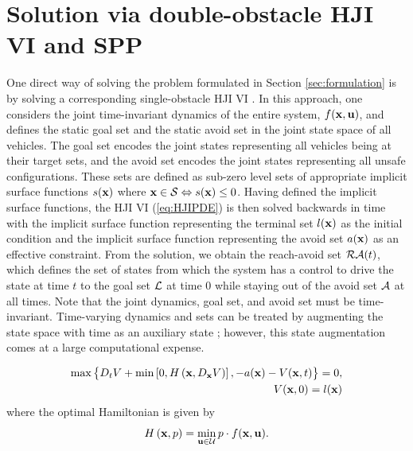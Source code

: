 \documentclass[letterpaper, 10pt, conference]{ieeeconf}      %
\begin{document}
\section{Solution via double-obstacle HJI VI and SPP\label{sec:solution}}
One direct way of solving the problem formulated in Section \ref{sec:formulation} is by solving a corresponding single-obstacle HJI VI \cite{mitchell05,bokanowski10}. In this approach, one considers the joint time-invariant dynamics of the entire system, $f(\mathbf{x},\mathbf{u})$, and defines the static goal set and the static avoid set in the joint state space of all vehicles. The goal set encodes the joint states representing all vehicles being at their target sets, and the avoid set encodes the joint states representing all unsafe configurations. These sets are defined as sub-zero level sets of appropriate implicit surface functions $s(\mathbf{x})$ where $\mathbf{x}\in\mathcal{S} \Leftrightarrow s(\mathbf{x})\le 0$. Having defined the implicit surface functions, the HJI VI (\ref{eq:HJIPDE}) is then solved backwards in time with the implicit surface function representing the terminal set $l(\mathbf{x})$ as the initial condition and the implicit surface function representing the avoid set $a(\mathbf{x})$ as an effective constraint. From the solution, we obtain the reach-avoid set $\mathcal{RA}(t)$, which defines the set of states from which the system has a control to drive the state at time $t$ to the goal set $\mathcal{L}$ at time $0$ while staying out of the avoid set $\mathcal{A}$ at all times. Note that the joint dynamics, goal set, and avoid set must be time-invariant. Time-varying dynamics and sets can be treated by augmenting the state space with time as an auxiliary state \cite{bokanowski11}; however, this state augmentation comes at a large computational expense.

\begin{equation}
\begin{aligned}
	\label{eq:HJIPDE}
	\max\big\{D_tV + \min \left[0, H\left(\mathbf{x},D_{\mathbf{x}}V\right)\right], -a(\mathbf{x})-V(\mathbf{x},t) \big\}= 0,\\
V(\mathbf{x},0) = l(\mathbf{x})	 
\end{aligned}
\end{equation}
\noindent where the optimal Hamiltonian is given by
\begin{equation*}
H\left(\mathbf{x},p\right) = \min_{\mathbf{u} \in \mathcal{U}} p \cdot f(\mathbf{x},\mathbf{u}).
\end{equation*}
\end{document}
